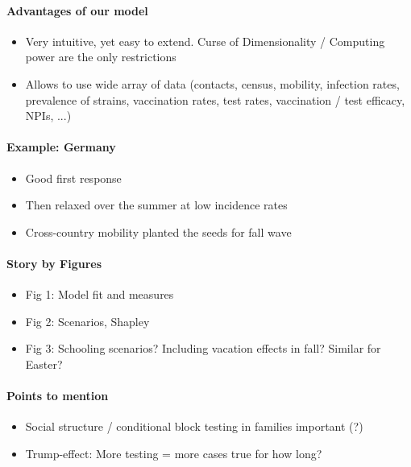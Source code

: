 \paragraph{Advantages of our model}
\begin{itemize}
    \item Very intuitive, yet easy to extend. Curse of Dimensionality / Computing power are the only restrictions
    \item Allows to use wide array of data (contacts, census, mobility, infection rates, prevalence of strains, vaccination rates, test rates, vaccination / test efficacy, NPIs, ...)
\end{itemize}    

\paragraph{Example: Germany}
\begin{itemize}
    \item Good first response
    \item Then relaxed over the summer at low incidence rates
    \item Cross-country mobility planted the seeds for fall wave
\end{itemize}

\paragraph{Story by Figures}
\begin{itemize}
    \item Fig 1: Model fit and measures
    \item Fig 2: Scenarios, Shapley
    \item Fig 3: Schooling scenarios? Including vacation effects in fall? Similar for Easter?
\end{itemize}

\paragraph{Points to mention}
\begin{itemize}
    \item Social structure / conditional block testing in families important (?)
    \item Trump-effect: More testing = more cases true for how long?
\end{itemize}


